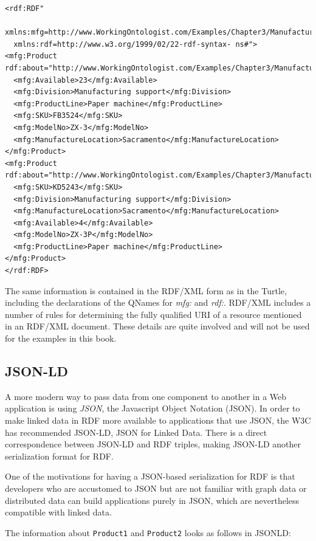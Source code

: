 \begin{lstlisting}
<rdf:RDF" 
  xmlns:mfg=http://www.WorkingOntologist.com/Examples/Chapter3/Manufacturing#"
  xmlns:rdf=http://www.w3.org/1999/02/22-rdf-syntax- ns#">
<mfg:Product rdf:about="http://www.WorkingOntologist.com/Examples/Chapter3/Manufacturing#Product1">
  <mfg:Available>23</mfg:Available>
  <mfg:Division>Manufacturing support</mfg:Division>
  <mfg:ProductLine>Paper machine</mfg:ProductLine>
  <mfg:SKU>FB3524</mfg:SKU>
  <mfg:ModelNo>ZX-3</mfg:ModelNo>
  <mfg:ManufactureLocation>Sacramento</mfg:ManufactureLocation>
</mfg:Product>
<mfg:Product rdf:about="http://www.WorkingOntologist.com/Examples/Chapter3/Manufacturing#Product2">
  <mfg:SKU>KD5243</mfg:SKU>
  <mfg:Division>Manufacturing support</mfg:Division>
  <mfg:ManufactureLocation>Sacramento</mfg:ManufactureLocation>
  <mfg:Available>4</mfg:Available>
  <mfg:ModelNo>ZX-3P</mfg:ModelNo>
  <mfg:ProductLine>Paper machine</mfg:ProductLine>
</mfg:Product> 
</rdf:RDF>
\end{lstlisting}

The same information is contained in the RDF/XML form as in the Turtle,
including the declarations of the QNames for \emph{mfg:} and \emph{rdf:}. RDF/XML
includes a number of rules for determining the fully qualified URI of a
resource mentioned in an RDF/XML document. These details are quite
involved and will not be used for the examples in this book.

\subsection{JSON-LD}
\label{ch3.JSON}

A more modern way to pass data from one component to another in a Web
application is using \emph{JSON}, the Javascript Object Notation (JSON). In
order to make linked data in RDF more available to applications that use
JSON, the W3C has recommended JSON-LD, JSON for Linked Data. There is a
direct correspondence between JSON-LD and RDF triples, making JSON-LD
another serialization format for RDF.

One of the motivations for having a JSON-based serialization for RDF is
that developers who are accustomed to JSON but are not familiar with
graph data or distributed data can build applications purely in JSON,
which are nevertheless compatible with linked data.

The information about \texttt{Product1} and \texttt{Product2} looks as follows in JSONLD:

